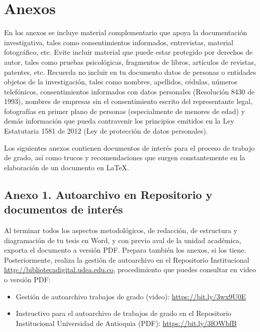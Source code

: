 \section*{ Anexos}

En los anexos se incluye material complementario que apoya la documentación investigativa, tales como consentimientos informados, entrevistas, material fotográfico, etc. Evite incluir material que puede estar protegido por derechos de autor, tales como pruebas psicológicas, fragmentos de libros, artículos de revistas, patentes, etc. Recuerda no incluir en tu documento datos de personas o entidades objetos de la investigación, tales como nombres, apellidos, cédulas, números telefónicos, consentimientos informados con datos personales (Resolución 8430 de 1993), nombres de empresas sin el consentimiento escrito del representante legal, fotografías en primer plano de personas (especialmente de menores de edad) y demás información que pueda contravenir los principios emitidos en la Ley Estatutaria 1581 de 2012 (Ley de protección de datos personales).

Los siguientes anexos contienen documentos de interés para el proceso de trabajo de grado, así como trucos y recomendaciones que surgen constantemente en la elaboración de un documento en \LaTeX.


\newpage

\subsection*{Anexo 1. Autoarchivo en Repositorio y documentos de interés}


Al terminar todos los aspectos metodológicos, de redacción, de estructura y diagramación de tu tesis en Word, y con previo aval de la unidad académica, exporta el documento a versión PDF. Prepara también los anexos, si los tiene. Posteriormente, realiza la gestión de autoarchivo en el Repositorio Institucional \url{http://bibliotecadigital.udea.edu.co}, procedimiento que puedes consultar en video o versión PDF:

\begin{itemize}
    \item Gestión de autoarchivo trabajos de grado (video): \url{https://bit.ly/3wx9U0E} 
    \item Instructivo para el autoarchivo de trabajos de grado en el Repositorio Institucional Universidad de Antioquia (PDF): \url{https://bit.ly/3fOWbfB}
\end{itemize}


